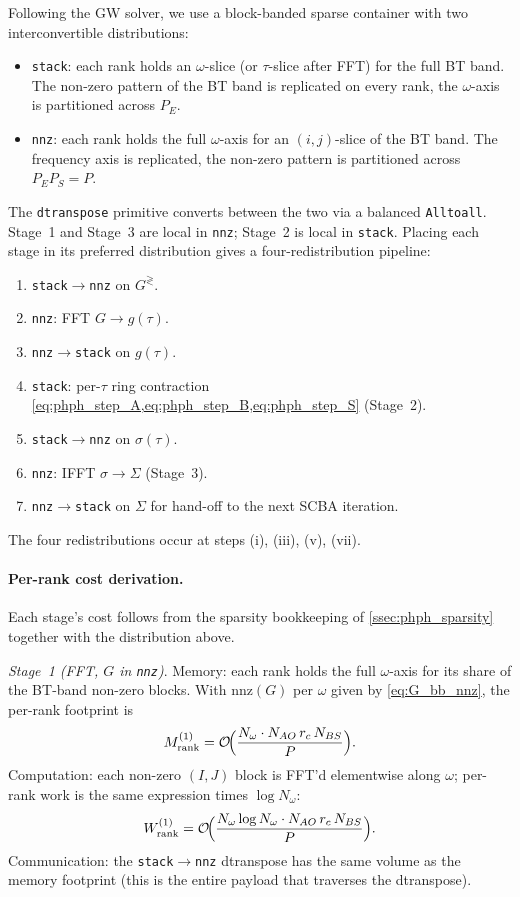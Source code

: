 Following the GW solver, we use a block-banded sparse container with two
interconvertible distributions:
\begin{itemize}
  \item \texttt{stack}: each rank holds an $\omega$-slice (or
        $\tau$-slice after FFT) for the full BT band. The non-zero
        pattern of the BT band is replicated on every rank, the
        $\omega$-axis is partitioned across $P_E$.
  \item \texttt{nnz}: each rank holds the full $\omega$-axis for an
        $(i,j)$-slice of the BT band. The frequency axis is
        replicated, the non-zero pattern is partitioned across
        $P_E P_S = P$.
\end{itemize}
The \texttt{dtranspose} primitive converts between the two via a
balanced \texttt{Alltoall}. Stage~1 and Stage~3 are local in
\texttt{nnz}; Stage~2 is local in \texttt{stack}. Placing each stage in its preferred
distribution gives a four-redistribution pipeline:
\begin{enumerate}[label=(\roman*)]
  \item \texttt{stack}$\to$\texttt{nnz} on $G^{\gtrless}$.
  \item \texttt{nnz}: FFT $G\to g(\tau)$.
  \item \texttt{nnz}$\to$\texttt{stack} on $g(\tau)$.
  \item \texttt{stack}: per-$\tau$ ring contraction
        \cref{eq:phph_step_A,eq:phph_step_B,eq:phph_step_S} (Stage~2).
  \item \texttt{stack}$\to$\texttt{nnz} on $\sigma(\tau)$.
  \item \texttt{nnz}: IFFT $\sigma\to\Sigma$ (Stage~3).
  \item \texttt{nnz}$\to$\texttt{stack} on $\Sigma$ for hand-off
        to the next SCBA iteration.
\end{enumerate}
The four redistributions occur at steps (i), (iii), (v), (vii).

\paragraph{Per-rank cost derivation.} Each stage's cost follows
from the sparsity bookkeeping of \cref{ssec:phph_sparsity} together
with the distribution above.

\emph{Stage~1 (FFT, $G$ in \texttt{nnz})}. Memory: each rank holds
the full $\omega$-axis for its share of the BT-band non-zero blocks.
With $\mathrm{nnz}(G)$ per $\omega$ given by \cref{eq:G_bb_nnz}, the
per-rank footprint is
\begin{equation}
  M^{(1)}_\mathrm{rank}
  = \mathcal{O}\!\Bigl(\frac{N_\omega \cdot N_{AO}\,r_c\,N_{BS}}{P}\Bigr).
\end{equation}
Computation: each non-zero $(I,J)$ block is FFT'd elementwise
along $\omega$; per-rank work is the same expression times
$\log N_\omega$:
\begin{equation}
  W^{(1)}_\mathrm{rank}
  = \mathcal{O}\!\Bigl(\frac{N_\omega\log N_\omega \cdot N_{AO}\,r_c\,N_{BS}}{P}\Bigr).
\end{equation}
Communication: the \texttt{stack}$\to$\texttt{nnz} dtranspose has
the same volume as the memory footprint (this is the entire payload
that traverses the dtranspose).

